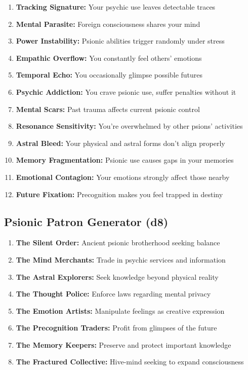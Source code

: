 \documentclass[11pt,twoside]{article}
\begin{document}
\begin{enumerate}[leftmargin=*]
    \item \textbf{Tracking Signature:} Your psychic use leaves detectable traces
    \item \textbf{Mental Parasite:} Foreign consciousness shares your mind
    \item \textbf{Power Instability:} Psionic abilities trigger randomly under stress
    \item \textbf{Empathic Overflow:} You constantly feel others' emotions
    \item \textbf{Temporal Echo:} You occasionally glimpse possible futures
    \item \textbf{Psychic Addiction:} You crave psionic use, suffer penalties without it
    \item \textbf{Mental Scars:} Past trauma affects current psionic control
    \item \textbf{Resonance Sensitivity:} You're overwhelmed by other psions' activities
    \item \textbf{Astral Bleed:} Your physical and astral forms don't align properly
    \item \textbf{Memory Fragmentation:} Psionic use causes gaps in your memories
    \item \textbf{Emotional Contagion:} Your emotions strongly affect those nearby
    \item \textbf{Future Fixation:} Precognition makes you feel trapped in destiny
\end{enumerate}

\subsection{Psionic Patron Generator (d8)}

\begin{enumerate}[leftmargin=*]
    \item \textbf{The Silent Order:} Ancient psionic brotherhood seeking balance
    \item \textbf{The Mind Merchants:} Trade in psychic services and information
    \item \textbf{The Astral Explorers:} Seek knowledge beyond physical reality
    \item \textbf{The Thought Police:} Enforce laws regarding mental privacy
    \item \textbf{The Emotion Artists:} Manipulate feelings as creative expression
    \item \textbf{The Precognition Traders:} Profit from glimpses of the future
    \item \textbf{The Memory Keepers:} Preserve and protect important knowledge
    \item \textbf{The Fractured Collective:} Hive-mind seeking to expand consciousness
\end{enumerate}
\end{document}
